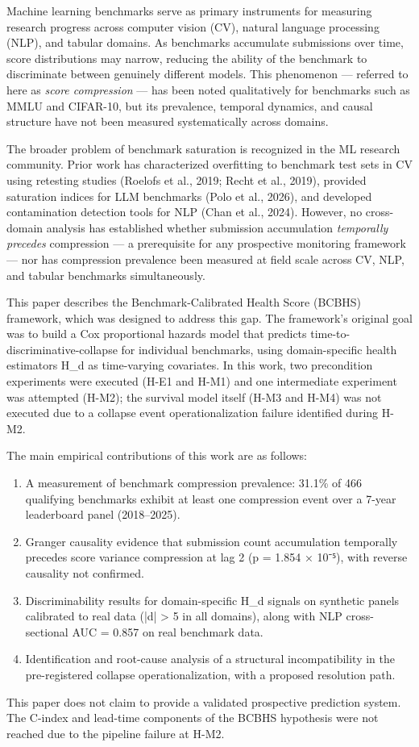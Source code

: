 
Machine learning benchmarks serve as primary instruments for measuring research progress across computer vision (CV), natural language processing (NLP), and tabular domains. As benchmarks accumulate submissions over time, score distributions may narrow, reducing the ability of the benchmark to discriminate between genuinely different models. This phenomenon — referred to here as \textit{score compression} — has been noted qualitatively for benchmarks such as MMLU and CIFAR-10, but its prevalence, temporal dynamics, and causal structure have not been measured systematically across domains.

The broader problem of benchmark saturation is recognized in the ML research community. Prior work has characterized overfitting to benchmark test sets in CV using retesting studies (Roelofs et al., 2019; Recht et al., 2019), provided saturation indices for LLM benchmarks (Polo et al., 2026), and developed contamination detection tools for NLP (Chan et al., 2024). However, no cross-domain analysis has established whether submission accumulation \textit{temporally precedes} compression — a prerequisite for any prospective monitoring framework — nor has compression prevalence been measured at field scale across CV, NLP, and tabular benchmarks simultaneously.

This paper describes the Benchmark-Calibrated Health Score (BCBHS) framework, which was designed to address this gap. The framework's original goal was to build a Cox proportional hazards model that predicts time-to-discriminative-collapse for individual benchmarks, using domain-specific health estimators H_d as time-varying covariates. In this work, two precondition experiments were executed (H-E1 and H-M1) and one intermediate experiment was attempted (H-M2); the survival model itself (H-M3 and H-M4) was not executed due to a collapse event operationalization failure identified during H-M2.

The main empirical contributions of this work are as follows:

\begin{enumerate}
\item A measurement of benchmark compression prevalence: 31.1\% of 466 qualifying benchmarks exhibit at least one compression event over a 7-year leaderboard panel (2018–2025).
\item Granger causality evidence that submission count accumulation temporally precedes score variance compression at lag 2 (p = 1.854 × 10⁻⁵), with reverse causality not confirmed.
\item Discriminability results for domain-specific H_d signals on synthetic panels calibrated to real data (|d| > 5 in all domains), along with NLP cross-sectional AUC = 0.857 on real benchmark data.
\item Identification and root-cause analysis of a structural incompatibility in the pre-registered collapse operationalization, with a proposed resolution path.
\end{enumerate}

This paper does not claim to provide a validated prospective prediction system. The C-index and lead-time components of the BCBHS hypothesis were not reached due to the pipeline failure at H-M2.


